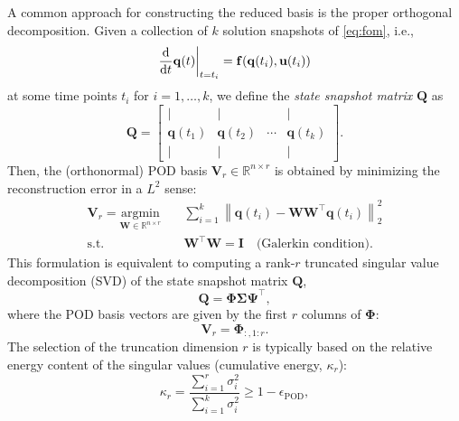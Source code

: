 A common approach for constructing the reduced basis is the proper orthogonal decomposition. Given a collection of $k$ solution snapshots of \eqref{eq:fom}, i.e.,\\$$\dv{}{t}\mathbf{q}(t)\bigg\rvert_{t=t_i}=\mathbf{f}(\mathbf{q}(t_i),\mathbf{u}(t_i))$$ at some time points $t_i$ for $i=1,\dots,k$, we define the \textit{state snapshot matrix} $\mathbf{Q}$ as\\
\begin{equation}
    \mathbf{Q} = \begin{bmatrix}
                    | & | & & | \\
                    \mathbf{q}(t_1) & \mathbf{q}(t_2) & \cdots & \mathbf{q}(t_{k}) \\
                    | & | & & |
                 \end{bmatrix}.
    \label{eq:snapshot_matrix}
\end{equation}
Then, the (orthonormal) POD basis $\mathbf{V}_r \in \mathbb{R}^{n \times r}$ is obtained by minimizing the reconstruction error in a $L^2$ sense:\\
\begin{equation}
\begin{aligned}
    \mathbf{V}_r = \underset{\mathbf{W} \in \mathbb{R}^{n \times r}}{\text{argmin}} \quad & \sum_{i=1}^k \left\|\mathbf{q}(t_i) - \mathbf{W}\mathbf{W}^\top\mathbf{q}(t_i)\right\|_2^2 \\
    \text{s.t.} \quad & \mathbf{W}^\top\mathbf{W} = \mathbf{I} \quad \text{(Galerkin condition)}.
\end{aligned}
\label{eq:pod_opt}
\end{equation}
This formulation is equivalent to computing a rank-$r$ truncated singular value decomposition (SVD) of the state snapshot matrix $\mathbf{Q}$,\\
$$\mathbf{Q} = \bm{\Phi}\bm{\Sigma}\bm{\Psi}^\top,$$
where the POD basis vectors are given by the first $r$ columns of $\bm{\Phi}$:\\
\begin{equation}
    \mathbf{V}_r = \bm{\Phi}_{:,1:r}.
    \label{eq:rbasis}
\end{equation}
The selection of the truncation dimension $r$ is typically based on the relative energy content of the singular values (cumulative energy, $\kappa_r$):\\
\begin{equation}
    \kappa_r=\dfrac{\displaystyle\sum_{i=1}^r \sigma_i^2}{\displaystyle\sum_{i=1}^k \sigma_i^2} \geq 1 - \epsilon_{\text{POD}},
    \label{eq:pod_trunc}
\end{equation}
